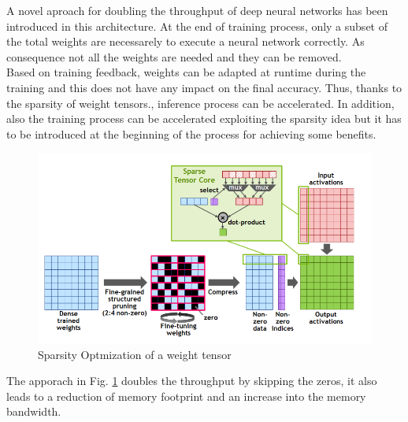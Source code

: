 A novel aproach for doubling the throughput of deep neural networks has been introduced in this architecture. At the end of training process, only a subset of the total weights are necessarely to execute a neural network correctly. As consequence not all the weights are needed and they can be removed.\\
Based on training feedback,  weights can be adapted at runtime during the training and this does not have any  impact on the final accuracy. Thus, thanks to the sparsity of weight tensors., inference process can be accelerated. In addition, also the training process can be accelerated exploiting the sparsity idea but it has to be introduced at the beginning of the process for achieving some benefits.

\begin{figure}[!htbp]
\centering
\captionsetup{justification=centering}
\includegraphics[scale=0.4]{./figure/sparsity.png}
\caption{Sparsity Optmization of a weight tensor\cite{paper:41}}
\label{fig:spa}
\end{figure}
The apporach in Fig. \ref{fig:spa} doubles the throughput by skipping the zeros, it also leads to a reduction of memory footprint and an increase into the memory bandwidth.\\

